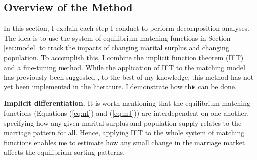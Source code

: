

\subsection{Overview of the Method} \label{sec:comparativemethod}
 In this section, I explain each step I conduct to perform decomposition analyses. The idea is to use the system of equilibrium matching functions in Section \ref{sec:model} to track the impacts of changing marital surplus and changing population. To accomplish this, I combine the implicit function theorem (IFT) and a fine-tuning method. While the application of IFT to the matching model has previously been suggested \citep{ChooSiow_2006_WhoMarriesWhomandWhy}, to the best of my knowledge, this method has not yet been implemented in the literature. I demonstrate how this can be done. 
 
\vspace{3mm}
\noindent \textbf{Implicit differentiation.}  It is worth mentioning that the equilibrium matching functions (Equations (\ref{eq:nI}) and (\ref{eq:mJ})) are interdependent on one another, specifying how any given marital surplus and population supply relates to the marriage pattern for all. Hence, applying IFT to the whole system of matching functions enables me to estimate how any small change in the marriage market affects the equilibrium sorting patterns. 


